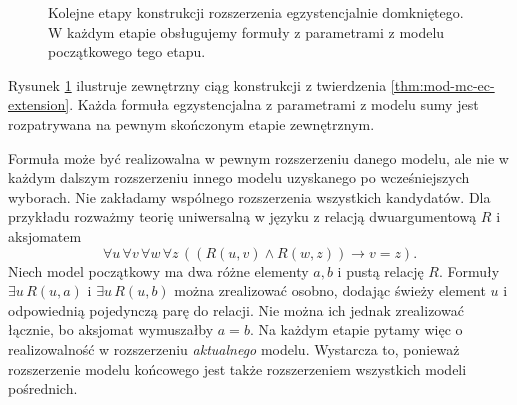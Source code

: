 \begin{figure}[htbp]
\centering
{}
\caption{Kolejne etapy konstrukcji rozszerzenia
egzystencjalnie domkniętego. W każdym etapie obsługujemy
formuły z parametrami z modelu początkowego tego etapu.}
\label{fig:mod-mc-ec-construction}
\end{figure}

Rysunek \ref{fig:mod-mc-ec-construction} ilustruje
zewnętrzny ciąg konstrukcji z twierdzenia
\ref{thm:mod-mc-ec-extension}. Każda formuła egzystencjalna
z parametrami z modelu sumy jest rozpatrywana na pewnym
skończonym etapie zewnętrznym.

\begin{uwaga}
\label{rem:mod-mc-ec-compatible}
Formuła może być realizowalna w pewnym rozszerzeniu
danego modelu, ale nie w każdym dalszym rozszerzeniu
innego modelu uzyskanego po wcześniejszych wyborach.
Nie zakładamy wspólnego rozszerzenia wszystkich
kandydatów. Dla przykładu rozważmy teorię uniwersalną
w języku z relacją dwuargumentową $R$ i aksjomatem
\[
\forall u\,\forall v\,\forall w\,\forall z\,
((R(u,v)\land R(w,z))\to v=z).
\]
Niech model początkowy ma dwa różne elementy $a,b$
i pustą relację $R$. Formuły
$\exists u\,R(u,a)$ i $\exists u\,R(u,b)$
można zrealizować osobno, dodając świeży element
$u$ i odpowiednią pojedynczą parę do relacji.
Nie można ich jednak zrealizować łącznie,
bo aksjomat wymuszałby $a=b$.
Na każdym etapie pytamy więc o realizowalność
w rozszerzeniu \emph{aktualnego} modelu.
Wystarcza to, ponieważ rozszerzenie modelu końcowego
jest także rozszerzeniem wszystkich modeli pośrednich.
\end{uwaga}

